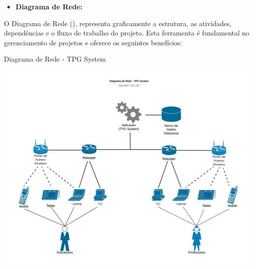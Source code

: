 \begin{itemize}

\item \textbf{Diagrama de Rede:}
\\

\end{itemize}

O Diagrama de Rede (), representa graficamente a estrutura, as atividades, dependências e o fluxo de trabalho do projeto. Esta ferramenta é fundamental no gerenciamento de projetos e oferece os seguintes benefícios:
\\

\begin{flowchart}[!h]
\centering
\caption{Diagrama de Rede - TPG System}%
\label{fcht:dgR.jpg}
\includegraphics[scale=0.32]{Illustrations/dgR.jpg}
\end{flowchart}

